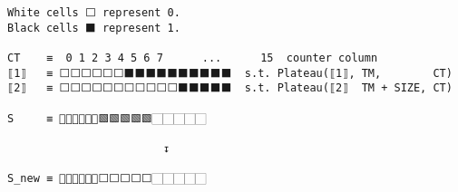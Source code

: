 \documentclass[varwidth=\maxdimen,margin=0.5cm,multi={verbatim}]{standalone}
\begin{document}
\begin{verbatim}
White cells ⬜ represent 0.
Black cells ⬛ represent 1.

CT    ≡  0 1 2 3 4 5 6 7      ...      15  counter column
⟦1⟧   ≡ ⬜⬜⬜⬜⬜⬜⬛⬛⬛⬛⬛⬛⬛⬛⬛⬛  s.t. Plateau(⟦1⟧, TM,        CT)
⟦2⟧   ≡ ⬜⬜⬜⬜⬜⬜⬜⬜⬜⬜⬜⬛⬛⬛⬛⬛  s.t. Plateau(⟦2⟧  TM + SIZE, CT)

S     ≡ 🏻🏻🏻🏻🏻🏻🟩🟩🟩🟩🟩🏻🏻🏻🏻🏻
                                      
                        ↧          

S_new ≡ 🏻🏻🏻🏻🏻🏻⬜⬜⬜⬜⬜🏻🏻🏻🏻🏻
\end{verbatim}
\end{document}

